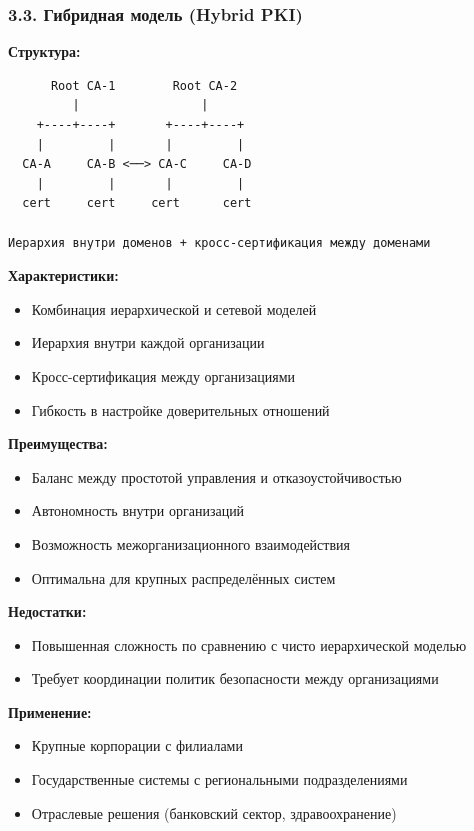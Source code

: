 \subsubsection*{3.3. Гибридная модель (Hybrid PKI)}

\textbf{Структура:}
\begin{verbatim}
      Root CA-1        Root CA-2
         |                 |
    +----+----+       +----+----+
    |         |       |         |
  CA-A     CA-B <──> CA-C     CA-D
    |         |       |         |
  cert     cert     cert      cert

Иерархия внутри доменов + кросс-сертификация между доменами
\end{verbatim}

\textbf{Характеристики:}
\begin{itemize}
    \item Комбинация иерархической и сетевой моделей
    \item Иерархия внутри каждой организации
    \item Кросс-сертификация между организациями
    \item Гибкость в настройке доверительных отношений
\end{itemize}

\textbf{Преимущества:}
\begin{itemize}
    \item Баланс между простотой управления и отказоустойчивостью
    \item Автономность внутри организаций
    \item Возможность межорганизационного взаимодействия
    \item Оптимальна для крупных распределённых систем
\end{itemize}

\textbf{Недостатки:}
\begin{itemize}
    \item Повышенная сложность по сравнению с чисто иерархической моделью
    \item Требует координации политик безопасности между организациями
\end{itemize}

\textbf{Применение:}
\begin{itemize}
    \item Крупные корпорации с филиалами
    \item Государственные системы с региональными подразделениями
    \item Отраслевые решения (банковский сектор, здравоохранение)
\end{itemize}

